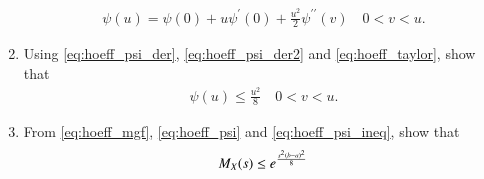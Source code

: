 \documentclass[journal,12pt,twocolumn]{IEEEtran}
\renewcommand\thesection{\arabic{section}}
\begin{document}
\begin{enumerate}[label=\thesection.\arabic*,ref=\thesection.\theenumi]
\begin{align}
\label{eq:hoeff_taylor}
\psi(u) = \psi(0)  + u\psi^{\prime}(0) + \frac{u^2}{2}\psi^{\prime\prime}(v) \quad 0 < v < u.
\end{align}
\item Using \eqref{eq:hoeff_psi_der}, \eqref{eq:hoeff_psi_der2} and \eqref{eq:hoeff_taylor}, show that 
\begin{align}
\label{eq:hoeff_psi_ineq}
\psi(u) \le  \frac{u^2}{8} \quad 0 < v < u.
\end{align}
\item From \eqref{eq:hoeff_mgf}, \eqref{eq:hoeff_psi} and \eqref{eq:hoeff_psi_ineq}, show that 
\begin{align}
\label{eq:hoeff_lemma}
M_{X}(s) \le  e^\frac{s^2\left(b-a\right)^2}{8} 
\end{align}

\end{enumerate}
\end{document}
